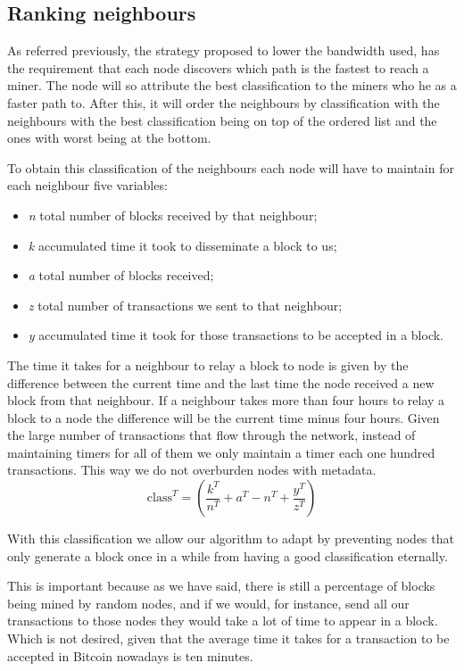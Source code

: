 \documentclass{dads}   %
\begin{document}
\subsection{Ranking neighbours}
As referred previously, the strategy proposed to lower the bandwidth used, has the requirement that each node discovers which path is the fastest to reach a miner. The node will so attribute the best classification to the miners who he as a faster path to. After this, it will order the neighbours by classification with the neighbours with the best classification being on top of the ordered list and the ones with worst being at the bottom.

To obtain this classification of the neighbours each node will have to maintain for each neighbour five variables:
\begin{itemize}
  \item \textit{n} total number of blocks received by that neighbour;
  \item \textit{k} accumulated time it took to disseminate a block to us;
  \item \textit{a} total number of blocks received;
  \item \textit{z} total number of transactions we sent to that neighbour;
  \item \textit{y} accumulated time it took for those transactions to be accepted in a block.
\end{itemize}

The time it takes for a neighbour to relay a block to node is given by the difference between the current time and the last time the node received a new block from that neighbour. If a neighbour takes more than four hours to relay a block to a node the difference will be the current time minus four hours. Given the large number of transactions that flow through the network, instead of maintaining timers for all of them we only maintain a timer each one hundred transactions. This way we do not overburden nodes with metadata.
\begin{displaymath} \mbox{class}^{T}= (\dfrac{k^{T}}{n^{T}} + a^{T} - n^{T} + \dfrac{y^{T}}{z^{T}}) \end{displaymath}

With this classification we allow our algorithm to adapt by preventing nodes that only generate a block once in a while from having a good classification eternally.

This is important because as we have said, there is still a percentage of blocks being mined by random nodes, and if we would, for instance, send all our transactions to those nodes they would take a lot of time to appear in a block. Which is not desired, given that the average time it takes for a transaction to be accepted in Bitcoin nowadays is ten minutes.
\end{document}
